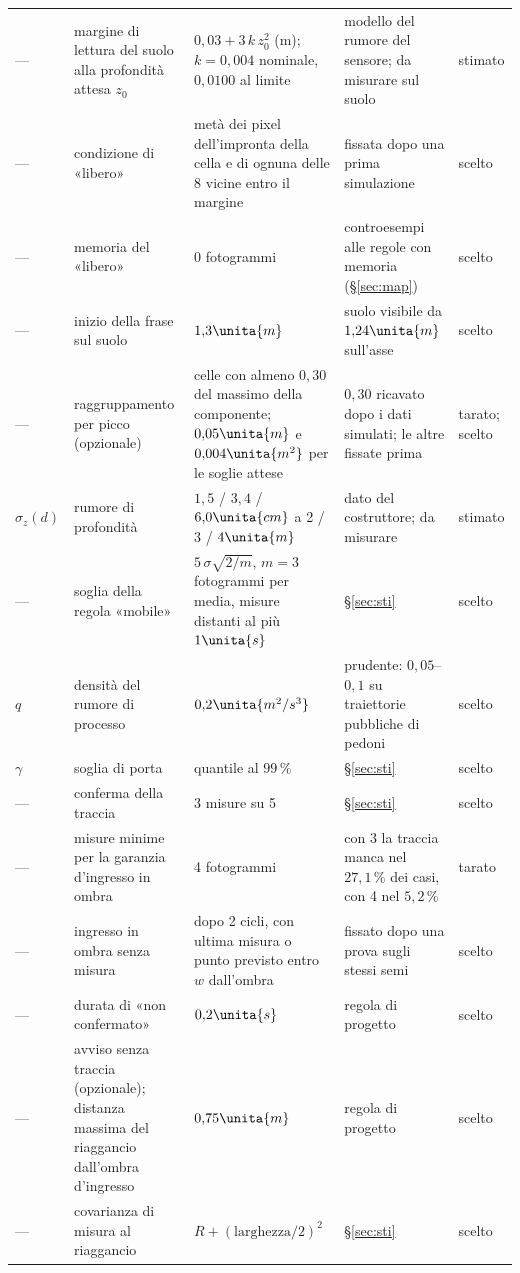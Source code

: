 \begin{table}[H]
\begin{tabularx}{\linewidth}{@{}p{1.25cm}Lp{3.5cm}Lp{1.2cm}@{}}
--- & margine di lettura del suolo alla profondità attesa $z_0$ & $0{,}03+3\,k\,z_0^2$ (m); $k=0{,}004$ nominale, $0{,}0100$ al limite & modello del rumore del sensore; da misurare sul suolo & stimato\\
--- & condizione di «libero» & metà dei pixel dell'impronta della cella e di ognuna delle 8 vicine entro il margine & fissata dopo una prima simulazione & scelto\\
--- & memoria del «libero» & 0 fotogrammi & controesempi alle regole con memoria (\S\ref{sec:map}) & scelto\\
--- & inizio della frase sul suolo & $1{,}3\unita{m}$ & suolo visibile da $1{,}24\unita{m}$ sull'asse & scelto\\
--- & raggruppamento per picco (opzionale) & celle con almeno $0{,}30$ del massimo della componente; $0{,}05\unita{m}$ e $0{,}004\unita{m^2}$ per le soglie attese & $0{,}30$ ricavato dopo i dati simulati; le altre fissate prima & tarato; scelto\\
$\sigma_z(d)$ & rumore di profondità & $1{,}5$ / $3{,}4$ / $6{,}0\unita{cm}$ a 2 / 3 / $4\unita{m}$ & dato del costruttore; da misurare & stimato\\
--- & soglia della regola «mobile» & $5\,\sigma\sqrt{2/m}$, $m=3$ fotogrammi per media, misure distanti al più $1\unita{s}$ & \S\ref{sec:sti} & scelto\\
$q$ & densità del rumore di processo & $0{,}2\unita{m^2/s^3}$ & prudente: $0{,}05$--$0{,}1$ su traiettorie pubbliche di pedoni & scelto\\
$\gamma$ & soglia di porta & quantile al $99\,\%$ & \S\ref{sec:sti} & scelto\\
--- & conferma della traccia & 3 misure su 5 & \S\ref{sec:sti} & scelto\\
--- & misure minime per la garanzia d'ingresso in ombra & 4 fotogrammi & con 3 la traccia manca nel $27{,}1\,\%$ dei casi, con 4 nel $5{,}2\,\%$ & tarato\\
--- & ingresso in ombra senza misura & dopo 2 cicli, con ultima misura o punto previsto entro $w$ dall'ombra & fissato dopo una prova sugli stessi semi & scelto\\
--- & durata di «non confermato» & $0{,}2\unita{s}$ & regola di progetto & scelto\\
--- & avviso senza traccia (opzionale); distanza massima del riaggancio dall'ombra d'ingresso & $0{,}75\unita{m}$ & regola di progetto & scelto\\
--- & covarianza di misura al riaggancio & $R+(\text{larghezza}/2)^2$ & \S\ref{sec:sti} & scelto\\
\bottomrule
\end{tabularx}
\end{table}

